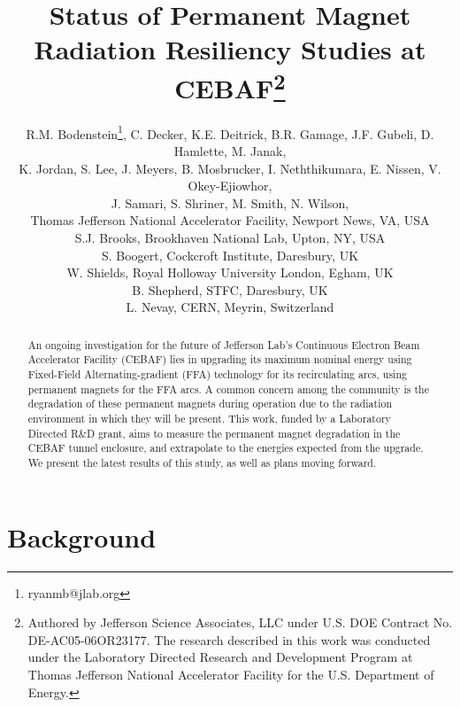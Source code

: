 \documentclass[a4paper,
               ]{jacow}
\begin{document}
\title{Status of Permanent Magnet Radiation Resiliency Studies at CEBAF\thanks{Authored by Jefferson Science Associates, LLC under U.S. DOE Contract No. DE-AC05-06OR23177. The research described in this work was conducted under the Laboratory Directed Research and Development Program at Thomas Jefferson National Accelerator Facility for the U.S. Department of Energy.}}

\author{R.M. Bodenstein\thanks{ryanmb@jlab.org}, C. Decker, K.E. Deitrick, B.R. Gamage, J.F. Gubeli, D. Hamlette, M. Janak,\\ K. Jordan, S. Lee, J. Meyers, B. Mosbrucker, I. Neththikumara,  E. Nissen, V. Okey-Ejiowhor,\\ J. Samari, S. Shriner, M. Smith, N. Wilson,\\ Thomas Jefferson National Accelerator Facility, Newport News, VA, USA \\
S.J. Brooks, Brookhaven National Lab, Upton, NY, USA \\
S. Boogert, Cockcroft Institute, Daresbury, UK\\
W. Shields, Royal Holloway University London, Egham, UK\\
B. Shepherd, STFC, Daresbury, UK\\
L. Nevay, CERN, Meyrin, Switzerland
    }
	
\maketitle

%
\begin{abstract}
An ongoing investigation for the future of Jefferson Lab’s Continuous Electron Beam Accelerator Facility (CEBAF) lies in upgrading its maximum nominal energy using Fixed-Field Alternating-gradient (FFA) technology for its recirculating arcs, using permanent magnets for the FFA arcs. A common concern among the community is the degradation of these permanent magnets during operation due to the radiation environment in which they will be present. This work, funded by a Laboratory Directed R\&D grant, aims to measure the permanent magnet degradation in the CEBAF tunnel enclosure, and extrapolate to the energies expected from the upgrade. We present the latest results of this study, as well as plans moving forward.
\end{abstract}

\section{Background}
\end{document}
